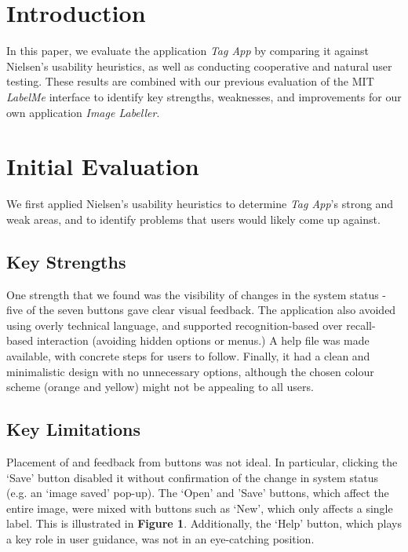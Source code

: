 \documentclass[11pt,twocolumn]{article}
\title{\thetitle}
\author{\theauthor}
\date{\today}
\begin{document}
\maketitle
\thispagestyle{empty}

\section{Introduction}

In this paper, we evaluate the application \emph{Tag App} by comparing it against Nielsen's usability heuristics, as well as conducting cooperative and natural user testing. These results are combined with our previous evaluation of the MIT \emph{LabelMe} interface to identify key strengths, weaknesses, and improvements for our own application \emph{Image Labeller}.

\section{Initial Evaluation}

We first applied Nielsen's usability heuristics\cite{nielsen1994} to determine \emph{Tag App}'s strong and weak areas, and to identify problems that users would likely come up against.

\subsection{Key Strengths}

One strength that we found was the visibility of changes in the system status - five of the seven buttons gave clear visual feedback. The application also avoided using overly technical language, and supported recognition-based over recall-based interaction (avoiding hidden options or menus.) A help file was made available, with concrete steps for users to follow. Finally, it had a
clean and minimalistic design with no unnecessary options, although the chosen colour scheme (orange and yellow) might not be appealing to all users. 

\subsection{Key Limitations}

\indent \indent Placement of and feedback from buttons was not ideal. In particular, clicking the `Save' button disabled it without confirmation of the change in system status (e.g. an `image saved' pop-up). The `Open' and 'Save' buttons, which affect the entire image, were mixed with buttons such as `New', which only affects a single label. This is illustrated in {\bf Figure 1}. Additionally, the `Help' button, which plays a key role in user guidance, was not in an eye-catching position.
\end{document}
